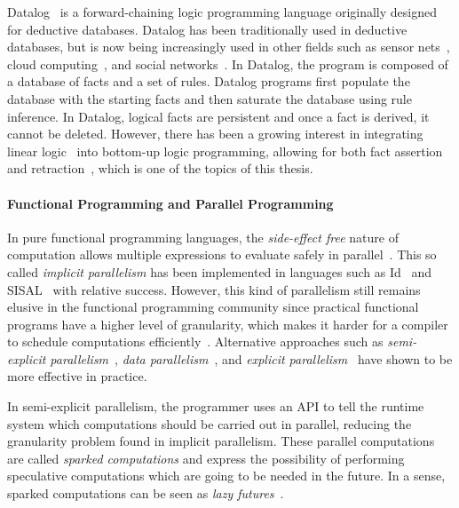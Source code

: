 Datalog~\cite{Ramakrishnan93asurvey,Ullman:1990:PDK:533142} is a
forward-chaining logic programming language originally designed for deductive
databases. Datalog has been traditionally used in deductive databases, but is
now being increasingly used in other fields such as sensor
nets~\cite{Chu:2007:DID:1322263.1322281}, cloud computing~\cite{alvaro:boom},
and social networks~\cite{Seo:2013:DSD:2556549.2556572}.  In Datalog, the
program is composed of a database of facts and a set of rules.  Datalog programs
first populate the database with the starting facts and then saturate the database using
rule inference. In Datalog, logical facts are persistent and once a fact is
derived, it cannot be deleted. However, there has been a growing interest in
integrating linear logic~\cite{girard-87} into bottom-up logic programming,
allowing for both fact assertion and
retraction~\cite{Chang03ajudgmental,Lopez:2005:MCL:1069774.1069778,simmons-lla,cruz-iclp14},
which is one of the topics of this thesis.

\paragraph{Functional Programming and Parallel Programming}

In pure functional programming languages, the \emph{side-effect free} nature of
computation allows multiple expressions to evaluate safely in
parallel~\cite{Loidl:2003}. This so called \emph{implicit parallelism} has been
implemented in languages such as Id~\cite{Nikhil93anoverview} and
SISAL~\cite{gaudiot2001sisal} with relative success. However, this kind of
parallelism still remains elusive in the functional programming community since
practical functional programs have a higher level of granularity, which makes it
harder for a compiler to schedule computations
efficiently~\cite{haskell_tutorial}.  Alternative approaches such as
\emph{semi-explicit parallelism}~\cite{Marlow:2010}, \emph{data
parallelism}~\cite{Blelloch:1996:PPA:227234.227246}, and \emph{explicit
parallelism}~\cite{harris2005composable} have shown to be more effective in
practice.

In semi-explicit parallelism, the programmer uses an API to tell the runtime
system which computations should be carried out in parallel, reducing the
granularity problem found in implicit parallelism. These parallel computations
are called \emph{sparked computations} and express the possibility of performing
speculative computations which are going to be needed in the future. In a sense,
sparked computations can be seen as \emph{lazy futures}~\cite{Baker:1977}.

